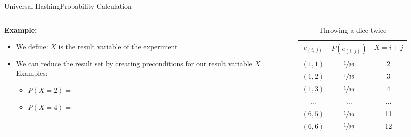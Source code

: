 \begin{frame}{Universal Hashing}{Probability Calculation}
  \begin{columns}
    \begin{column}{0.55\linewidth}
      \textbf{Example:}
      \begin{itemize}
        \item
          We define: {\color{Mittel-Blau}$X$} is the result variable of the experiment
        \item
          We can reduce the result set by creating preconditions for our
          result variable {\color{Mittel-Blau}$X$}\\[0.5em]
          Examples:
          \begin{itemize}
            \item
              {\color{Mittel-Blau}$P(X = 2) = $}
            \item
              {\color{Mittel-Blau}$P(X = 4) = $}
          \end{itemize}
      \end{itemize}
    \end{column}
    \begin{column}{0.45\linewidth}
      \begin{table}[!h]
        \caption{Throwing a dice twice}
        \label{tab:probabilities:rolling_dice_twice2}
        \begin{tabularx}{0.95\linewidth}{c|cc}
          {\color{Mittel-Blau}$e_{(i,\,j)}$} & {\color{Mittel-Blau}$P(e_{(i,\,j)})$} & {\color{Mittel-Blau}$X = i + j$}\\
          \midrule
          $(1, 1)$ & $\sfrac{1}{36}$ & 2\\
          $(1, 2)$ & $\sfrac{1}{36}$ & 3\\
          $(1, 3)$ & $\sfrac{1}{36}$ & 4\\
          $\dots$ & $\dots$ & $\dots$\\
          $(6, 5)$ & $\sfrac{1}{36}$ & 11\\
          $(6, 6)$ & $\sfrac{1}{36}$ & 12\\
        \end{tabularx}
      \end{table}
    \end{column}
  \end{columns}
\end{frame}


